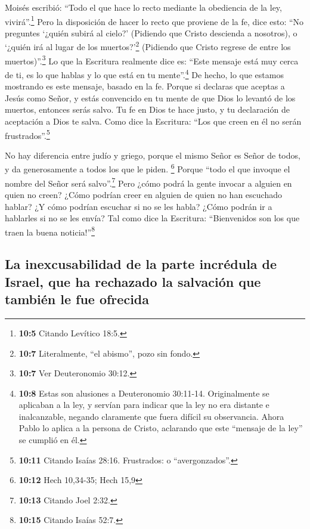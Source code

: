  Moisés escribió: ``Todo el que hace lo recto mediante la
obediencia de la ley, vivirá''.\footnote{\textbf{10:5} Citando Levítico
  18:5.}  Pero la disposición de hacer lo recto que
proviene de la fe, dice esto: ``No preguntes `¿quién subirá al cielo?'
(Pidiendo que Cristo descienda a nosotros),  o `¿quién irá
al lugar de los muertos?'\footnote{\textbf{10:7} Literalmente, ``el
  abismo'', pozo sin fondo.} (Pidiendo que Cristo regrese de entre los
muertos)''.\footnote{\textbf{10:7} Ver Deuteronomio 30:12.}
 Lo que la Escritura realmente dice es: ``Este mensaje
está muy cerca de ti, es lo que hablas y lo que está en tu
mente''.\footnote{\textbf{10:8} Estas son alusiones a Deuteronomio
  30:11-14. Originalmente se aplicaban a la ley, y servían para indicar
  que la ley no era distante e inalcanzable, negando claramente que
  fuera difícil su observancia. Ahora Pablo lo aplica a la persona de
  Cristo, aclarando que este ``mensaje de la ley'' se cumplió en él.} De
hecho, lo que estamos mostrando es este mensaje, basado en la fe.
 Porque si declaras que aceptas a Jesús como Señor, y
estás convencido en tu mente de que Dios lo levantó de los muertos,
entonces serás salvo.  Tu fe en Dios te hace justo, y tu
declaración de aceptación a Dios te salva.  Como dice la
Escritura: ``Los que creen en él no serán frustrados''.\footnote{\textbf{10:11}
  Citando Isaías 28:16. Frustrados: o ``avergonzados''.}

 No hay diferencia entre judío y griego, porque el mismo
Señor es Señor de todos, y da generosamente a todos los que le piden.
\footnote{\textbf{10:12} Hech 10,34-35; Hech 15,9} 
Porque ``todo el que invoque el nombre del Señor será
salvo''.\footnote{\textbf{10:13} Citando Joel 2:32.} 
Pero ¿cómo podrá la gente invocar a alguien en quien no creen? ¿Cómo
podrían creer en alguien de quien no han escuchado hablar? ¿Y cómo
podrían escuchar si no se les habla?  ¿Cómo podrán ir a
hablarles si no se les envía? Tal como dice la Escritura: ``Bienvenidos
son los que traen la buena noticia!''\footnote{\textbf{10:15} Citando
  Isaías 52:7.}

\hypertarget{la-inexcusabilidad-de-la-parte-incruxe9dula-de-israel-que-ha-rechazado-la-salvaciuxf3n-que-tambiuxe9n-le-fue-ofrecida}{%
\subsection{La inexcusabilidad de la parte incrédula de Israel, que ha
rechazado la salvación que también le fue
ofrecida}\label{la-inexcusabilidad-de-la-parte-incruxe9dula-de-israel-que-ha-rechazado-la-salvaciuxf3n-que-tambiuxe9n-le-fue-ofrecida}}

